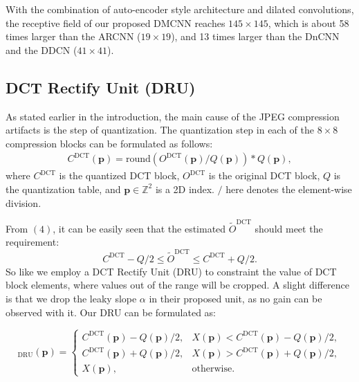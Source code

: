\documentclass{article}
\begin{document}
With the combination of auto-encoder style architecture and
dilated convolutions, the receptive field of our proposed DMCNN reaches
$145 \times 145$, which is about 58 times larger than the ARCNN
($19 \times 19$), and 13 times larger than the DnCNN and
the DDCN ($41 \times 41$).
\vspace{-0.2cm}

\subsection{DCT Rectify Unit (DRU)}
\label{ssec:dru}

As stated earlier in the introduction, the main cause of the
JPEG compression artifacts is the step of quantization. The quantization step
in each of the $8 \times 8$ compression blocks can be formulated as follows:
\begin{equation}
  \begin{aligned}
    C^\text{DCT}(\mathbf{p}) = \text{round}(O^\text{DCT}(\mathbf{p})
    / Q(\mathbf{p})) * Q(\mathbf{p}),
  \end{aligned}
\end{equation}
where $C^\text{DCT}$ is the quantized DCT block, $O^\text{DCT}$ is
the original DCT block, $Q$ is the quantization table, and
$\mathbf{p} \in \mathbb{Z}^2$ is a 2D index. $/$ here denotes
the element-wise division.

From $(4)$, it can be easily seen that the estimated $\tilde O^\text{DCT}$
should meet the requirement:
\begin{equation}
  C^\text{DCT} - Q/2 \le \tilde O^\text{DCT} \le C^\text{DCT} + Q/2.
\end{equation}
So like \cite{guo2016building} we employ a DCT Rectify Unit (DRU) to constraint
the value of DCT block elements, where values out of the range will be cropped.
A slight difference is that we drop the leaky slope $\alpha$ in their proposed
unit, as no gain can be observed with it. Our DRU can be formulated as:

\footnotesize
\begin{equation}
  [X]_\text{DRU}(\mathbf{p})=
    \begin{cases}
      C^\text{DCT}(\mathbf{p}) - Q(\mathbf{p}) / 2,
      & X(\mathbf{p})<C^\text{DCT}(\mathbf{p}) - Q(\mathbf{p}) / 2,  \\
      C^\text{DCT}(\mathbf{p}) + Q(\mathbf{p}) / 2, 
      & X(\mathbf{p})>C^\text{DCT}(\mathbf{p}) + Q(\mathbf{p}) / 2,  \\
      X(\mathbf{p}),
      & \text{otherwise}.
    \end{cases}
\end{equation}
\normalsize
\end{document}
